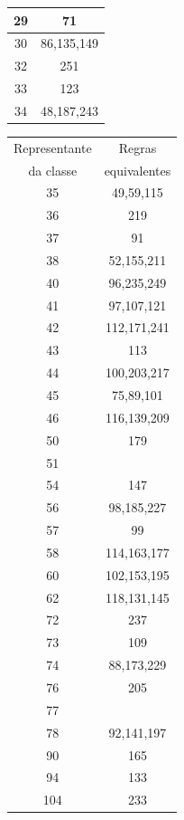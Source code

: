 \documentclass[12pt,a4paper]{article}
\begin{document}
\begin{table}[H]
\begin{minipage}[b]{0.3\linewidth}
\begin{tabular}{|c|c|}
29  & 71 \\ \hline
30  & 86,135,149 \\ \hline
32  & 251 \\ \hline
33  & 123 \\ \hline
34  & 48,187,243 \\ \hline
\end{tabular}
\end{minipage}
\hspace{0.3cm}
\begin{minipage}[b]{0.3\linewidth}
\centering
\begin{tabular}{|c|c|}
\hline
\footnotesize Representante & \footnotesize Regras \\
{\footnotesize da classe} & \footnotesize equivalentes \\ \hline
35  & 49,59,115 \\ \hline
36  & 219 \\ \hline
37  & 91 \\ \hline
38  & 52,155,211 \\ \hline
40  & 96,235,249 \\ \hline
41  & 97,107,121 \\ \hline
42  & 112,171,241 \\ \hline
43  & 113 \\ \hline
44  & 100,203,217 \\ \hline
45  & 75,89,101 \\ \hline
46  & 116,139,209 \\ \hline
50  & 179 \\ \hline
51  & \\ \hline
54  & 147 \\ \hline
56  & 98,185,227 \\ \hline
57  & 99 \\ \hline
58  & 114,163,177 \\ \hline
60  & 102,153,195 \\ \hline
62  & 118,131,145 \\ \hline
72  & 237 \\ \hline
73  & 109 \\ \hline
74  & 88,173,229 \\ \hline
76  & 205 \\ \hline
77  & \\ \hline
78  & 92,141,197 \\ \hline
90  & 165 \\ \hline
94  & 133 \\ \hline
104 & 233 \\ \hline

\end{tabular}
\end{minipage}
\end{table}
\end{document}
